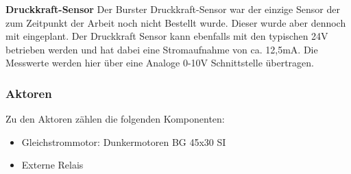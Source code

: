 \noindent\textbf{Druckkraft-Sensor}\newline
Der Burster Druckkraft-Sensor war der einzige Sensor der zum Zeitpunkt der Arbeit noch nicht Bestellt wurde. Dieser wurde aber dennoch mit eingeplant. Der Druckkraft Sensor kann ebenfalls mit den typischen 24V betrieben werden und hat dabei eine Stromaufnahme von ca. 12,5mA. Die Messwerte werden hier über eine Analoge 0-10V Schnittstelle übertragen.\\
\subsubsection{Aktoren}
Zu den Aktoren zählen die folgenden Komponenten:
\begin{itemize}
	\item Gleichstrommotor: Dunkermotoren BG 45x30 SI
	\item Externe Relais
\end{itemize}

